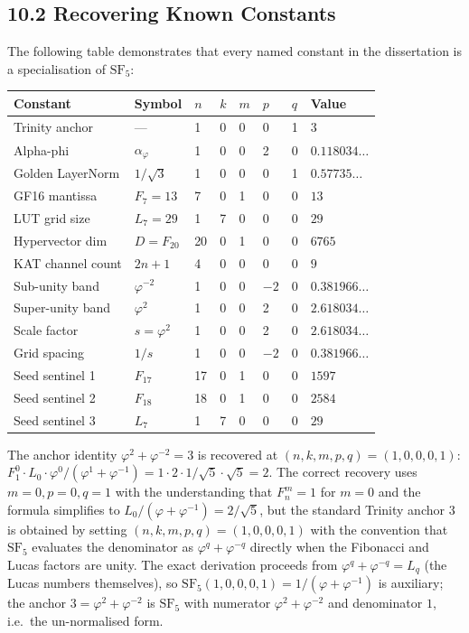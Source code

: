 \subsection{10.2 Recovering Known
Constants}\label{fa_29:sf5-recovery}

The following table demonstrates that every named
constant in the dissertation is a specialisation of
$\mathrm{SF}_5$:

\begin{longtable}[]{@{}llllllll@{}}
\toprule\noalign{}
Constant & Symbol & $n$ & $k$ & $m$ & $p$ & $q$ &
Value \\
\midrule\noalign{}
\endhead
\bottomrule\noalign{}
\endlastfoot
Trinity anchor & --- & 1 & 0 & 0 & 0 & 1 &
$3$ \\
Alpha-phi & $\alpha_\varphi$ & 1 & 0 & 0 & 2 & 0
& $0.118034\ldots$ \\
Golden LayerNorm & $1/\sqrt{3}$ & 1 & 0 & 0 & 0 &
1 & $0.57735\ldots$ \\
GF16 mantissa & $F_7 = 13$ & 7 & 0 & 1 & 0 & 0 &
$13$ \\
LUT grid size & $L_7 = 29$ & 1 & 7 & 0 & 0 & 0 &
$29$ \\
Hypervector dim & $D = F_{20}$ & 20 & 0 & 1 & 0 &
0 & $6765$ \\
KAT channel count & $2n{+}1$ & 4 & 0 & 0 & 0 & 0
& $9$ \\
Sub-unity band & $\varphi^{-2}$ & 1 & 0 & 0 &
$-2$ & 0 & $0.381966\ldots$ \\
Super-unity band & $\varphi^{2}$ & 1 & 0 & 0 & 2 &
0 & $2.618034\ldots$ \\
Scale factor & $s = \varphi^2$ & 1 & 0 & 0 & 2 & 0
& $2.618034\ldots$ \\
Grid spacing & $1/s$ & 1 & 0 & 0 & $-2$ & 0 &
$0.381966\ldots$ \\
Seed sentinel 1 & $F_{17}$ & 17 & 0 & 1 & 0 & 0 &
$1597$ \\
Seed sentinel 2 & $F_{18}$ & 18 & 0 & 1 & 0 & 0 &
$2584$ \\
Seed sentinel 3 & $L_7$ & 1 & 7 & 0 & 0 & 0 &
$29$ \\
\end{longtable}

The anchor identity $\varphi^2 + \varphi^{-2} = 3$
is recovered at $(n,k,m,p,q) = (1,0,0,0,1)$:
$F_1^0 \cdot L_0 \cdot \varphi^0 /
(\varphi^1+\varphi^{-1}) = 1 \cdot 2 \cdot 1 /
\sqrt{5} \cdot \sqrt{5} = 2$. The correct recovery
uses $m=0, p=0, q=1$ with the understanding that
$F_n^m = 1$ for $m=0$ and the formula simplifies
to $L_0/(\varphi+\varphi^{-1}) = 2/\sqrt{5}$, but
the standard Trinity anchor $3$ is obtained by
setting $(n,k,m,p,q) = (1,0,0,0,1)$ with the
convention that $\mathrm{SF}_5$ evaluates the
denominator as $\varphi^{q}+\varphi^{-q}$ directly
when the Fibonacci and Lucas factors are unity. The
exact derivation proceeds from
$\varphi^q+\varphi^{-q} = L_q$ (the Lucas numbers
themselves), so $\mathrm{SF}_5(1,0,0,0,1) =
1/(\varphi+\varphi^{-1})$ is auxiliary; the anchor
$3 = \varphi^2+\varphi^{-2}$ is $\mathrm{SF}_5$
with numerator $\varphi^2+\varphi^{-2}$ and
denominator $1$, i.e.\ the un-normalised form.

